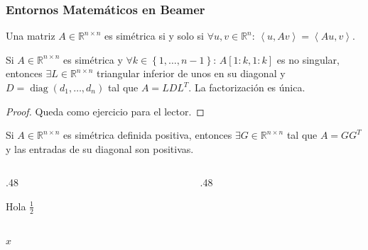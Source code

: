 \documentclass[8pt,aspectratio=1610,c,spanish]{beamer}
\begin{document}
\begin{frame}
\frametitle{Entornos Matemáticos en Beamer}

\begin{definition}
Una matriz $A\in\mathbb{R}^{n\times n}$ es \alert{simétrica} si y solo si $\forall u,v\in\mathbb{R}^{n}$:
$\left\langle u,Av\right\rangle=\left\langle Au,v\right\rangle$.
\end{definition}

\begin{theorem}
Si $A\in\mathbb{R}^{n\times n}$ es simétrica y $\forall k\in\left\{1,\dotsc,n-1\right\}$: $A\left[1:k, 1:k\right]$
es no singular, entonces $\exists L\in\mathbb{R}^{n\times n}$ triangular inferior de unos en su diagonal y
$D=\operatorname{diag}\left(d_{1},\dotsc,d_{n}\right)$ tal que $A=LDL^{T}$. La factorización es única.
\end{theorem}

\begin{proof}Queda como ejercicio para el lector.\end{proof}

\begin{corollary}
Si $A\in\mathbb{R}^{n\times n}$ es simétrica definida positiva, entonces $\exists G\in\mathbb{R}^{n\times n}$ tal que
$A=GG^{T}$ y las entradas de su diagonal son positivas.
\end{corollary}

\begin{lemma}\end{lemma}

\begin{columns}
\begin{column}{.48\paperwidth}
	\begin{example}Hola $\frac{1}{2}$\end{example}
\end{column}
\begin{column}{.48\paperwidth}
	\begin{examples}\end{examples}
\end{column}
\end{columns}
\end{frame}

\begin{frame}
	$x$
\end{frame}
\end{document}

